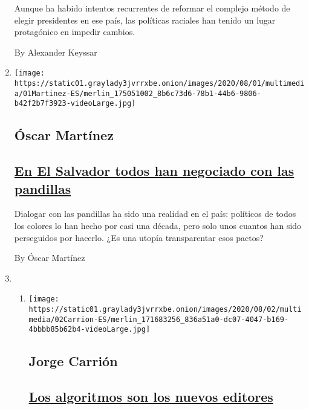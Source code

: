 \begin{enumerate}
  Aunque ha habido intentos recurrentes de reformar el complejo método
  de elegir presidentes en ese país, las políticas raciales han tenido
  un lugar protagónico en impedir cambios.

  By Alexander Keyssar
\item
  \texttt{[image: https://static01.graylady3jvrrxbe.onion/images/2020/08/01/multimedia/01Martinez-ES/merlin\_175051002\_8b6c73d6-78b1-44b6-9806-b42f2b7f3923-videoLarge.jpg]}

  \hypertarget{uxf3scar-martuxednez}{%
  \subsection{Óscar Martínez}\label{uxf3scar-martuxednez}}

  \hypertarget{en-el-salvador-todos-han-negociado-con-las-pandillas}{%
  \subsection{\texorpdfstring{\href{/es/2020/08/02/espanol/opinion/pandillas-el-salvador.html}{En
  El Salvador todos han negociado con las
  pandillas}}{En El Salvador todos han negociado con las pandillas}}\label{en-el-salvador-todos-han-negociado-con-las-pandillas}}

  Dialogar con las pandillas ha sido una realidad en el país: políticos
  de todos los colores lo han hecho por casi una década, pero solo unos
  cuantos han sido perseguidos por hacerlo. ¿Es una utopía transparentar
  esos pactos?

  By Óscar Martínez
\item
  \begin{enumerate}
  \def\labelenumii{\arabic{enumii}.}
  \item
    \texttt{[image: https://static01.graylady3jvrrxbe.onion/images/2020/08/02/multimedia/02Carrion-ES/merlin\_171683256\_836a51a0-dc07-4047-b169-4bbbb85b62b4-videoLarge.jpg]}

    \hypertarget{jorge-carriuxf3n}{%
    \subsection{Jorge Carrión}\label{jorge-carriuxf3n}}

    \hypertarget{los-algoritmos-son-los-nuevos-editores}{%
    \subsection{\texorpdfstring{\href{/es/2020/08/02/espanol/opinion/facebook-amazon-instagram.html}{Los
    algoritmos son los nuevos
    editores}}{Los algoritmos son los nuevos editores}}\label{los-algoritmos-son-los-nuevos-editores}}


\end{enumerate}
\end{enumerate}
